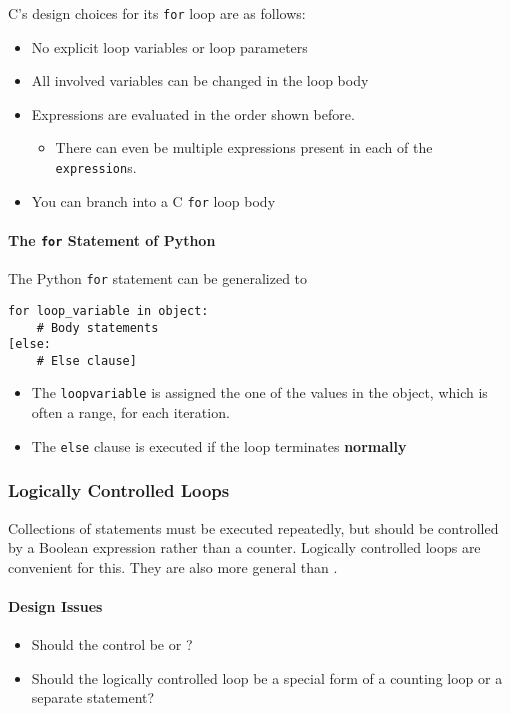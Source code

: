 C's design choices for its \texttt{for} loop are as follows:
\begin{itemize}[noitemsep]
\item No explicit loop variables or loop parameters
\item All involved variables can be changed in the loop body
\item Expressions are evaluated in the order shown before.
  \begin{itemize}[noitemsep]
  \item There can even be multiple expressions present in each of the \texttt{expression}s.
  \end{itemize}
\item You can branch into a C \texttt{for} loop body
\end{itemize}

\paragraph{The \texttt{for} Statement of Python}\label{par:Counter_Controlled_Loops-Python}
The Python \texttt{for} statement can be generalized to
\begin{verbatim}
for loop_variable in object:
    # Body statements
[else:
    # Else clause]
\end{verbatim}

\begin{itemize}[noitemsep]
\item The \texttt{loop\textunderscore{}variable} is assigned the one of the values in the object, which is often a range, for each iteration.
\item The \texttt{else} clause is executed if the loop terminates \textbf{normally}
\end{itemize}

\subsubsection{Logically Controlled Loops}\label{subsubsec:Logically_Controlled_Loops}
Collections of statements must be executed repeatedly, but should be controlled by a Boolean expression rather than a counter.
Logically controlled loops are convenient for this.
They are also more general than .

\paragraph{Design Issues}\label{par:Logically_Controlled_Loops-Design_Issues}
\begin{itemize}[noitemsep]
\item Should the control be  or ?
\item Should the logically controlled loop be a special form of a counting loop or a separate statement?
\end{itemize}


